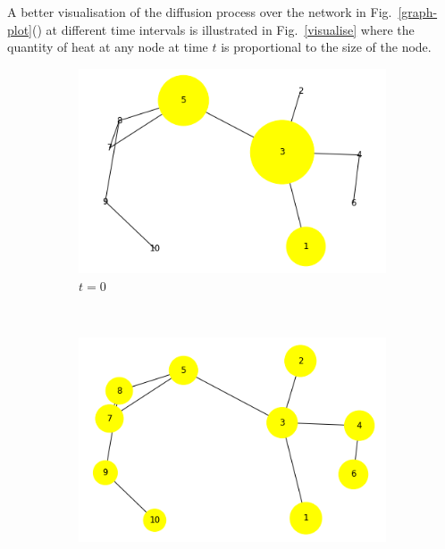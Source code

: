 \documentclass[10pt,a4paper]{article}
\begin{document}


A better visualisation of the diffusion process over the network in Fig.~\ref{graph-plot}() at different time intervals is illustrated in Fig.~\ref{visualise} where the quantity of heat at any node at time $t$ is proportional to the size of the node.

\begin{figure}[!h]
	\centering
	\begin{subfigure}[b]{0.38\textwidth}
		\includegraphics[width=\textwidth]{images/newdiff-nodesize0.png}
		\caption{$t=0$}
		\label{t1}
	\end{subfigure}~
	\begin{subfigure}[b]{0.38\textwidth}
		\includegraphics[width= \textwidth]{images/newdiff-nodesize4.png}

\end{subfigure}
\end{figure}
\end{document}
